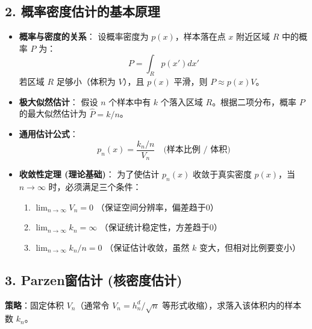 \documentclass[a4paper, 11pt]{ctexart}
\begin{document}
\subsection{2. 概率密度估计的基本原理}
\begin{itemize}
    \item \textbf{概率与密度的关系}：
    设概率密度为 $p(x)$，样本落在点 $x$ 附近区域 $R$ 中的概率 $P$ 为：
    \begin{equation}
        P = \int_{R} p(x') dx'
    \end{equation}
    若区域 $R$ 足够小（体积为 $V$），且 $p(x)$ 平滑，则 $P \approx p(x)V$。
    
    \item \textbf{极大似然估计}：
    假设 $n$ 个样本中有 $k$ 个落入区域 $R$。根据二项分布，概率 $P$ 的最大似然估计为 $\hat{P} = k/n$。
    
    \item \textbf{通用估计公式}：
    \begin{equation}
        p_n(x) = \frac{k_n/n}{V_n} \quad \text{(样本比例 / 体积)}
    \end{equation}
    
    \item \textbf{收敛性定理 (理论基础)}：
    为了使估计 $p_n(x)$ 收敛于真实密度 $p(x)$，当 $n \to \infty$ 时，必须满足三个条件：
    \begin{enumerate}
        \item $\lim_{n \to \infty} V_n = 0$ （保证空间分辨率，偏差趋于0）
        \item $\lim_{n \to \infty} k_n = \infty$ （保证统计稳定性，方差趋于0）
        \item $\lim_{n \to \infty} k_n/n = 0$ （保证估计收敛，虽然 $k$ 变大，但相对比例要变小）
    \end{enumerate}
\end{itemize}

\subsection{3. Parzen窗估计 (核密度估计)}
\textbf{策略}：固定体积 $V_n$（通常令 $V_n = h_n^d / \sqrt{n}$ 等形式收缩），求落入该体积内的样本数 $k_n$。
\end{document}
